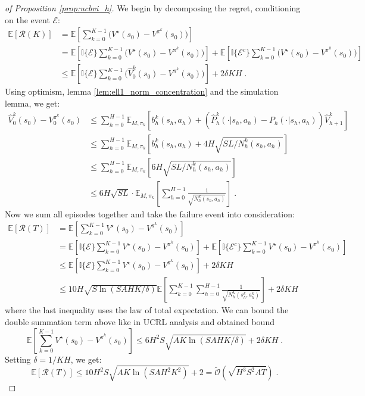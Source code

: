 \documentclass{article}
\numberwithin{equation}{section}
\newcommand{\one}[1]{\mathbb{I}\{#1\}}
\newcommand{\eqsp}{\;}
\begin{document}
\begin{proof}[of Proposition \ref{prop:ucbvi_h}]
We begin by decomposing the regret, conditioning on the event \(\mathcal{E}\):
\begin{align*}
    \mathbb{E}[\mathcal{R}(K)]
    &= \mathbb{E}\!\left[ \sum_{k=0}^{K-1} \big( V^{\star}(s_0) - V^{\pi^k}(s_0) \big) \right] \\
    &= \mathbb{E} \!\left[ \one{\mathcal{E}}\sum_{k=0}^{K-1} \big( V^{\star}(s_0) - V^{\pi^k}(s_0) \big) \right]
       + \mathbb{E} \!\left[ \one{\mathcal{E}^c} \sum_{k=0}^{K-1} \big( V^{\star}(s_0) - V^{\pi^k}(s_0) \big) \right] \\
    &\leq \mathbb{E} \!\left[ \one{\mathcal{E}} \sum_{k=0}^{K-1} \big( \widehat{V}^{k}_0(s_0) - V^{\pi^k}(s_0) \big) \right]
       + 2\delta K H \eqsp.
\end{align*}
Using optimism, lemma \ref{lem:ell1_norm_concentration} and the simulation lemma, we get:
\begin{align*}
     \widehat{V}_0^k(s_0) - V^{\pi^k}_0(s_0) &\leq\sum_{h=0}^{H-1}\mathbb{E}_{M,\pi_k} \left[ b_h^k(s_h,a_h) + \left(\widehat{P}_h^k(\cdot|s_h,a_h) - P_h(\cdot|s_h,a_h)\right)\widehat{V}_{h+1}^{k}\right] \\
     &\leq \sum_{h=0}^{H-1}\mathbb{E}_{M,\pi_k} \left[ b_h^k(s_h,a_h) + 4H\sqrt{SL/N_h^k(s_h,a_h)}\right] \\
     &\leq \sum_{h=0}^{H-1}\mathbb{E}_{M,\pi_k} \left[6H\sqrt{SL/N_h^k(s_h,a_h)}\right] \\
     &\leq 6H\sqrt{SL}\cdot \mathbb{E}_{M,\pi_k}\left[ \sum_{h=0}^{H-1}\frac{1}{\sqrt{N_h^k(s_h,a_h)}}\right] \eqsp.
\end{align*}
Now we sum all episodes together and take the failure event into consideration:
\begin{align*}
    \mathbb{E}[\mathcal{R}(T)] &= \mathbb{E}\left[\sum_{k=0}^{K-1}V^{\star}(s_0) - V^{\pi^k}(s_0)\right]\\
    &= \mathbb{E}\left[\one{\mathcal{E}}\sum_{k=0}^{K-1}V^{\star}(s_0) - V^{\pi^k}(s_0)\right] + \mathbb{E}\left[\one{\mathcal{E}^c}\sum_{k=0}^{K-1}V^{\star}(s_0) - V^{\pi^k}(s_0)\right] \\
    &\leq \mathbb{E}\left[\one{\mathcal{E}}\sum_{k=0}^{K-1}V^{\star}(s_0) - V^{\pi^k}(s_0)\right] + 2\delta KH \\
    &\leq 10H\sqrt{S\ln(SAHK/\delta)}\mathbb{E}\left[\sum_{k=0}^{K-1}\sum_{h=0}^{H-1}\frac{1}{\sqrt{N_h^k(s_h^k, a_h^k)}}\right] + 2\delta KH
\end{align*}
where the last inequality uses the law of total expectation.
We can bound the double summation term above like in UCRL analysis and obtained bound
\[\mathbb{E}\left[\sum_{k=0}^{K-1}V^{\star}(s_0) - V^{\pi^k}(s_0)\right] \leq 6H^2S\sqrt{AK\ln (SAHK/\delta)} + 2\delta KH\eqsp.\]
Setting \(\delta=1/KH\), we get:
\[\mathbb{E}[\mathcal{R}(T)]\leq 10H^2S\sqrt{AK\ln (SAH^2K^2)} + 2 = \widetilde{\mathcal{O}}(\sqrt{H^3S^2AT})\eqsp.\]
\end{proof}
\end{document}
